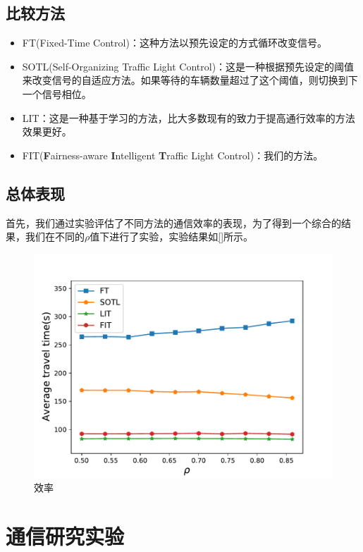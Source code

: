 \subsection{比较方法}
\begin{itemize}
    \item FT(Fixed-Time Control\cite{miller1963settings})：这种方法以预先设定的方式循环改变信号。
    \item SOTL(Self-Organizing Traffic Light Control\cite{cools2013self})：这是一种根据预先设定的阈值来改变信号的自适应方法。如果等待的车辆数量超过了这个阈值，则切换到下一个信号相位。
    \item LIT\cite{zheng2019diagnosing}：这是一种基于学习的方法，比大多数现有的致力于提高通行效率的方法效果更好。
    \item FIT(\textbf{F}airness-aware \textbf{I}ntelligent \textbf{T}raffic Light Control)：我们的方法。
\end{itemize}
\subsection{总体表现}
首先，我们通过实验评估了不同方法的通信效率的表现，为了得到一个综合的结果，我们在不同的$\rho$值下进行了实验，实验结果如\autoref{}所示。
\begin{figure}[htb]
    \includegraphics[width=12cm]{fig/efficiency.pdf}
    \caption{效率}
    \label{fig:efficiency}
  \end{figure}

\section{通信研究实验}